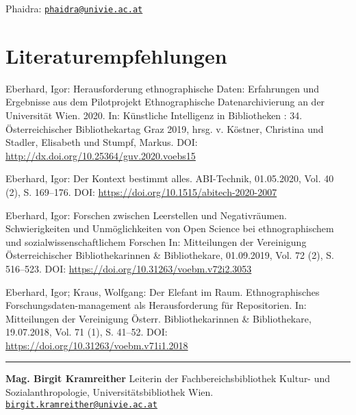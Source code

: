 \documentclass[a4paper,
fontsize=11pt,
oneside,
numbers=noperiodatend,
parskip=half-,
bibliography=totoc,
final
]{scrartcl}
\begin{document}
Phaidra: \href{mailto:phaidra@univie.ac.at}{\nolinkurl{phaidra@univie.ac.at}}

\hypertarget{literaturempfehlungen}{%
\section{Literaturempfehlungen}\label{literaturempfehlungen}}

Eberhard, Igor: Herausforderung ethnographische Daten: Erfahrungen und
Ergebnisse aus dem Pilotprojekt Ethnographische Datenarchivierung an der
Universität Wien. 2020. In: Künstliche Intelligenz in Bibliotheken : 34.
Österreichischer Bibliothekartag Graz 2019, hrsg. v. Köstner, Christina
und Stadler, Elisabeth und Stumpf, Markus. DOI:
\url{http://dx.doi.org/10.25364/guv.2020.voebs15}

Eberhard, Igor: Der Kontext bestimmt alles. ABI-Technik, 01.05.2020,
Vol. 40 (2), S. 169--176. DOI:
\url{https://doi.org/10.1515/abitech-2020-2007}

Eberhard, Igor: Forschen zwischen Leerstellen und Negativräumen.
Schwierigkeiten und Unmöglichkeiten von Open Science bei
ethnographischem und sozialwissenschaftlichem Forschen In: Mitteilungen
der Vereinigung Österreichischer Bibliothekarinnen \& Bibliothekare,
01.09.2019, Vol. 72 (2), S. 516--523. DOI:
\url{https://doi.org/10.31263/voebm.v72i2.3053}

Eberhard, Igor; Kraus, Wolfgang: Der Elefant im Raum. Ethnographisches
Forschungsdaten-management als Herausforderung für Repositorien. In:
Mitteilungen der Vereinigung Österr. Bibliothekarinnen \& Bibliothekare,
19.07.2018, Vol. 71 (1), S. 41--52. DOI:
\url{https://doi.org/10.31263/voebm.v71i1.2018}

\begin{center}\rule{0.5\linewidth}{0.5pt}\end{center}

\textbf{Mag. Birgit Kramreither} Leiterin der Fachbereichsbibliothek
Kultur- und Sozialanthropologie, Universitätsbibliothek Wien.
\href{mailto:birgit.kramreither@univie.ac.at}{\nolinkurl{birgit.kramreither@univie.ac.at}}
\end{document}

